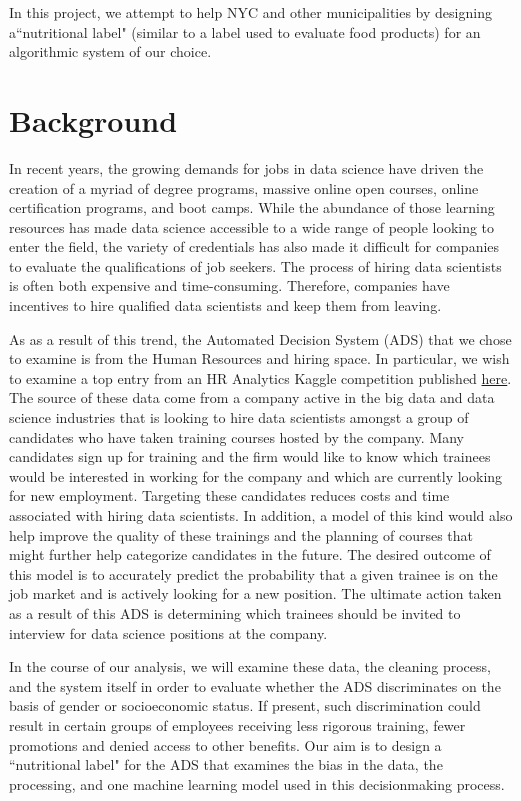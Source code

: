 In this project, we attempt to help NYC and other municipalities by designing a``nutritional label" (similar to a label used to evaluate food products) for an algorithmic system of our choice. 
\pagebreak

\section{Background}
In recent years, the growing demands for jobs in data science have driven the creation of a myriad of degree programs, massive online open courses, online certification programs, and boot camps. While the abundance of those learning resources has made data science accessible to a wide range of people looking to enter the field, the variety of credentials has also made it difficult for companies to evaluate the qualifications of job seekers. The process of hiring data scientists is often both expensive and time-consuming. Therefore, companies have incentives to hire qualified data scientists and keep them from leaving. 

As as a result of this trend, the Automated Decision System (ADS) that we chose to examine is from the Human Resources and hiring space.  In particular, we wish to examine a top entry from an HR Analytics Kaggle competition published \href{https://www.kaggle.com/code/joshuaswords/awesome-hr-data-visualization-prediction/notebook}{here}.  The source of these data come from a company active in the big data and data science industries that is looking to hire data scientists amongst a group of candidates who have taken training courses hosted by the company.  Many candidates sign up for training and the firm would like to know which trainees would be interested in working for the company and which are currently looking for new employment.  Targeting these candidates reduces costs and time associated with hiring data scientists.  In addition, a model of this kind would also help improve the quality of these trainings and the planning of courses that might further help categorize candidates in the future.  The desired outcome of this model is to accurately predict the probability that a given trainee is on the job market and is actively looking for a new position.  The ultimate action taken as a result of this ADS is determining which trainees should be invited to interview for data science positions at the company.

In the course of our analysis, we will examine these data, the cleaning process, and the system itself in order to evaluate whether the ADS discriminates on the basis of gender or socioeconomic status. If present, such discrimination could result in certain groups of employees receiving less rigorous training, fewer promotions and denied access to other benefits. Our aim is to design a ``nutritional label" for the ADS that examines the bias in the data, the processing, and one machine learning model used in this decision\-making process. 



